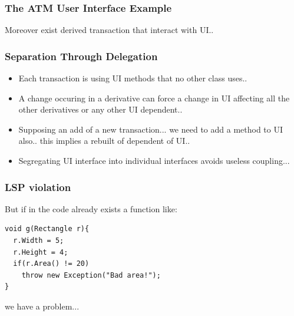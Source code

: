 \documentclass{beamer}
\begin{document}
\begin{frame}
  \frametitle{The ATM User Interface Example}
  Moreover exist derived transaction that interact with UI.. \\
  \begin{center}
  \end{center}
\end{frame}


\begin{frame}
  \frametitle{Separation Through Delegation}
  \begin{itemize}
	\item<+-> Each transaction is using UI methods that no other class uses..
	\item<+-> A change occuring in a derivative can force a change in UI affecting all the other derivatives or any other UI dependent..
	\item<+-> Supposing an add of a new transaction... we need to add a method to UI also.. this implies a rebuilt of dependent of UI..
	\item<+-> Segregating UI interface into individual interfaces avoids useless coupling...
   \end{itemize}
\end{frame}


\begin{frame}[containsverbatim]
	\frametitle{LSP violation}
	But if in the code already exists a function like: \\
	\begin{lstlisting}
void g(Rectangle r){
  r.Width = 5;
  r.Height = 4;
  if(r.Area() != 20)
    throw new Exception("Bad area!");
}
	\end{lstlisting}
	we have a problem... \\
\end{frame}
\end{document}
